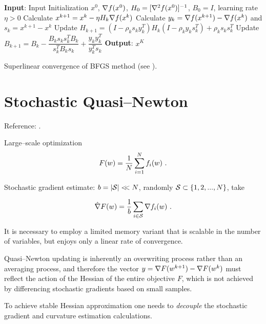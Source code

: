 \begin{algorithm}[H]
\caption{Quasi--Newton: BFGS method}
\label{Alg:BFGS}
\begin{algorithmic}[1]
\STATE \textbf{Input}: Input Initialization $x^0$, $\nabla f(x^0)$, $H_0=[\nabla^2 f(x^0)]^{-1}$, $B_0=I$, learning rate $\eta>0$
    \STATE Calculate $x^{k+1}=x^k-\eta H_k \nabla f(x^k)$
    \STATE Calculate $y_k=\nabla f(x^{k+1})-\nabla f(x^k)$ and $s_k=x^{k+1}-x^k$
    \STATE Update $H_{k+1}=(I-\rho_ks_ky_k^T)H_k(I-\rho_ky_ks_k^T)+\rho_ks_ks_k^T$
    \STATE Update $B_{k+1}=B_k-\dfrac{B_ks_ks_k^TB_k}{s_k^TB_ks_k}+\dfrac{y_ky_k^T}{y_k^Ts_k}$
\ENDFOR
\STATE \textbf{Output}: $x^K$
\end{algorithmic}
\end{algorithm}

Superlinear convergence of BFGS method (see \cite[Theorem 6.6]{NocedalWrightNumericalOptimization}).

\section{Stochastic Quasi--Newton}

Reference: \cite{ByrdHansenNocedalStochasticQuasiNewtonSIAMOptimization}.

Large--scale optimization
$$F(w)=\dfrac{1}{N}\sum\li_{i=1}^N f_i(w) \ .$$

Stochastic gradient estimate: $b=|\mathcal S|<\!\!<N$, randomly $\mathcal S\subset\{1,2,...,N\}$, take

$$\hat{\nabla} F(w)=\dfrac{1}{b}\sum\limits_{i\in \mathcal S}\nabla f_i(w) \ .$$

It is necessary to employ a limited memory variant that is scalable in the number of variables, but enjoys only a linear rate of convergence.

Quasi--Newton updating is inherently an overwriting process rather than an averaging process, and therefore the vector
$y=\nabla F(w^{k+1})-\nabla F(w^k)$ must reflect the action of the Hessian of the entire objective $F$, which is not
achieved by differencing stochastic gradients based on small samples.

To achieve stable Hessian approximation one needs to \textit{decouple} the stochastic gradient and curvature estimation calculations.

